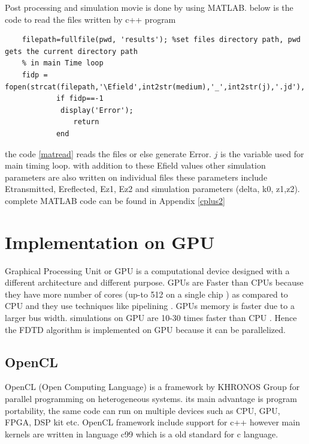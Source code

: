 Post processing and simulation movie is done by using MATLAB. below is the code to read the files written by c++ program
\begin{lstlisting}
	filepath=fullfile(pwd, 'results'); %set files directory path, pwd gets the current directory path
	% in main Time loop
	fidp = fopen(strcat(filepath,'\Efield',int2str(medium),'_',int2str(j),'.jd'),'r','l');
	        if fidp==-1
           	 display('Error');
       	        return
        	end
\end{lstlisting}
the code \ref{matread}  reads the files or else generate Error. $j$ is the variable used for main timing loop. with addition to these Efield values other simulation parameters are also written on individual files these parameters include Etransmitted, Ereflected, Ez1, Ez2 and simulation parameters (delta, k0, z1,z2). complete MATLAB code can be found in Appendix \ref{cplus2}
\clearpage
\section{Implementation on GPU }
Graphical Processing Unit or GPU is a computational device designed with a different architecture and different purpose. GPUs are Faster than CPUs because they have more number of cores (up-to 512 on a single chip \cite{cpuvsgpunotes}
) as compared to CPU and they use techniques like pipelining \cite{ref:gpu2}. GPUs memory is faster due to a larger bus width. simulations on GPU are 10-30 times faster than CPU \cite{Ref:gpuvscpui}
. Hence the FDTD algorithm is implemented on GPU because it can be parallelized.

\subsection{OpenCL}
OpenCL (Open Computing Language) is a framework by KHRONOS Group \cite{Khronos}
for parallel programming on heterogeneous systems. its main advantage is program portability, the same code can run on multiple devices such as CPU, GPU, FPGA, DSP kit \cite{ref:devices}
 etc. OpenCL framework include support for c++ however main kernels are written in language c99 which is a old standard for c language.
